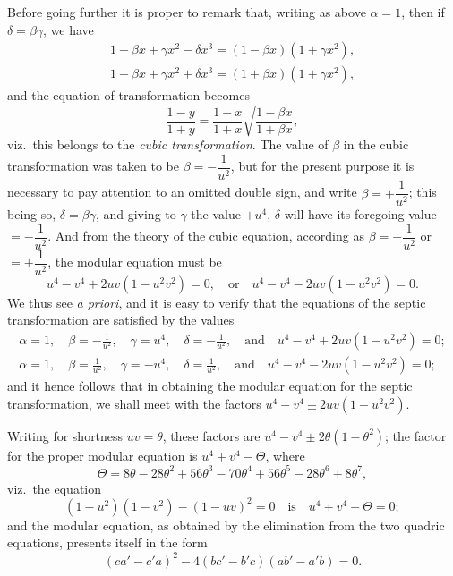 \documentclass[12pt,a4paper]{article}
\begin{document}
Before going further it is proper to remark that, writing as above $\alpha = 1$, then if $\delta = \beta\gamma$, we have
\begin{gather*}
1 - \beta x + \gamma x^2 - \delta x^3 = (1 - \beta x)(1 + \gamma x^2),\\
1 + \beta x + \gamma x^2 + \delta x^3 = (1 + \beta x)(1 + \gamma x^2),
\end{gather*}
and the equation of transformation becomes
\[
\frac{1 - y}{1 + y} = \frac{1 - x}{1 + x}\sqrt{\frac{1 - \beta x}{1 + \beta x}},
\]
viz.\ this belongs to the \textit{cubic transformation}. The value of $\beta$ in the cubic transformation was taken to be $\beta = -\dfrac{1}{u^2}$, but for the present purpose it is necessary to pay attention to an omitted double sign, and write $\beta = +\dfrac{1}{u^2}$; this being so, $\delta = \beta\gamma$, and giving to $\gamma$ the value $+u^4$, $\delta$ will have its foregoing value $= -\dfrac{1}{u^2}$. And from the theory of the cubic equation, according as $\beta = -\dfrac{1}{u^2}$ or $= +\dfrac{1}{u^2}$, the modular equation must be
\[
u^4 - v^4 + 2uv(1 - u^2 v^2) = 0,\quad\text{or}\quad u^4 - v^4 - 2uv(1 - u^2 v^2) = 0.
\]
We thus see \textit{a priori}, and it is easy to verify that the equations of the septic transformation are satisfied by the values
\begin{gather*}
\alpha = 1,\quad \beta = -\frac{1}{u^2},\quad \gamma = u^4,\quad \delta = -\frac{1}{u^2},\quad\text{and}\quad u^4 - v^4 + 2uv(1 - u^2 v^2) = 0;\\
\alpha = 1,\quad \beta = \frac{1}{u^2},\quad \gamma = -u^4,\quad \delta = \frac{1}{u^2},\quad\text{and}\quad u^4 - v^4 - 2uv(1 - u^2 v^2) = 0;
\end{gather*}
and it hence follows that in obtaining the modular equation for the septic transformation, we shall meet with the factors $u^4 - v^4 \pm 2uv(1 - u^2 v^2)$.

Writing for shortness $uv = \theta$, these factors are $u^4 - v^4 \pm 2\theta(1 - \theta^2)$; the factor for the proper modular equation is $u^4 + v^4 - \Theta$, where
\[
\Theta = 8\theta - 28\theta^2 + 56\theta^3 - 70\theta^4 + 56\theta^5 - 28\theta^6 + 8\theta^7,
\]
viz.\ the equation
\[
(1 - u^2)(1 - v^2) - (1 - uv)^2 = 0\quad\text{is}\quad u^4 + v^4 - \Theta = 0;
\]
and the modular equation, as obtained by the elimination from the two quadric equations, presents itself in the form
\[
(ca' - c'a)^2 - 4(bc' - b'c)(ab' - a'b) = 0.
\]
\end{document}
